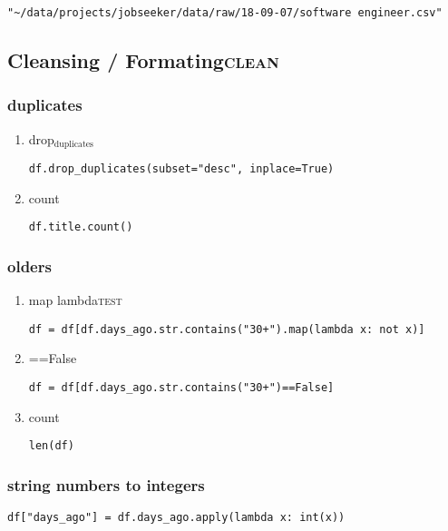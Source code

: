 \documentclass[11pt]{article}
\begin{document}
\begin{verbatim}
"~/data/projects/jobseeker/data/raw/18-09-07/software engineer.csv"
\end{verbatim}
\subsection{Cleansing / Formating\hfill{}\textsc{clean}}
\label{sec:org622b296}
\subsubsection{duplicates}
\label{sec:org6b51386}
\begin{enumerate}
\item drop\(_{\text{duplicates}}\)
\label{sec:orge8b194f}
\begin{verbatim}
df.drop_duplicates(subset="desc", inplace=True)
\end{verbatim}

\item count
\label{sec:orgf5405ab}
\begin{verbatim}
df.title.count()
\end{verbatim}
\end{enumerate}

\subsubsection{olders}
\label{sec:orgef73d9b}
\begin{enumerate}
\item map lambda\hfill{}\textsc{test}
\label{sec:org3d79cd2}
\begin{verbatim}
df = df[df.days_ago.str.contains("30+").map(lambda x: not x)]
\end{verbatim}

\item ==False
\label{sec:orgea15944}
\begin{verbatim}
df = df[df.days_ago.str.contains("30+")==False]
\end{verbatim}

\item count
\label{sec:org4bdcd5f}
\begin{verbatim}
len(df)
\end{verbatim}
\end{enumerate}

\subsubsection{string numbers to integers}
\label{sec:orgda15a88}
\begin{verbatim}
df["days_ago"] = df.days_ago.apply(lambda x: int(x))
\end{verbatim}
\end{document}
